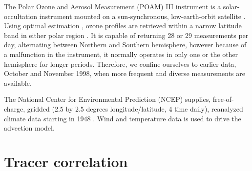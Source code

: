The Polar Ozone and Aerosol Measurement (POAM) III instrument is a solar-
occultation instrument mounted on a sun-synchronous, low-earth-orbit
satellite \citep{Lucke_etal1999}.  
Using optimal estimation \citep{Rodgers2000}, ozone profiles are retrieved 
within a narrow latitude band in either polar region \citep{Lumpe_etal2002}.  
It is capable of returning 28 or 29 measurements per day,
alternating between Northern and Southern hemisphere, however because of
a malfunction
in the instrument, it normally operates in only one or the other hemisphere for longer periods.  Therefore, we confine ourselves to earlier data,
October and November 1998, when more frequent and diverse measurements
are available.

The National Center for Environmental Prediction (NCEP) supplies, 
free-of-charge,
gridded (2.5 by 2.5 degrees longitude/latitude, 4 time daily), reanalyzed 
climate data starting in 1948 \citep{Kalnay_etal1996}.
Wind and temperature data is used to drive the advection model.

\section{Tracer correlation}

